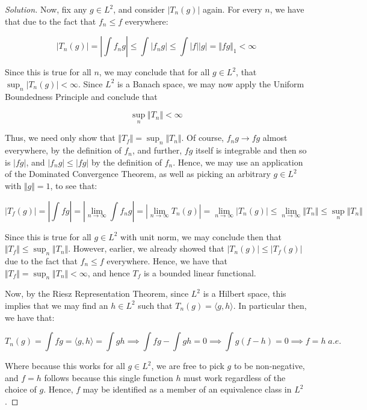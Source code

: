 \documentclass[10pt]{article}
\begin{document}
\begin{proof}[Solution]
Now, fix any $g \in L^2$, and consider $| T_n(g)|$ again. For every $n$, we have that due to the fact that $f_n \leq f$ everywhere:

$$ | T_n(g) | = \left| \int f_n g \right | \leq \int | f_n g |  \leq \int |f||g| = \Vert fg \Vert_1 < \infty $$

Since this is true for all $n$, we may conclude that for all $g \in L^2$, that $\sup_{n} | T_n(g) | < \infty$. Since $L^2$ is a Banach space, we may now apply the Uniform Boundedness Principle and conclude that

$$ \sup_{n} \Vert T_n \Vert < \infty$$

Thus, we need only show that $ \Vert T_f \Vert = \sup_{n} \Vert T_n \Vert$. Of course, $f_ng \to fg$ almost everywhere, by the definition of $f_n$, and further, $fg$ itself is integrable and then so is $|fg|$, and $| f_n g | \leq |fg|$ by the definition of $f_n$. Hence, we may use an application of the Dominated Convergence Theorem, as well as picking an arbitrary $g \in L^2$ with $\Vert g \Vert = 1$, to see that:



$$ | T_f(g) | = \left| \int fg \right| = \left|  \lim_{n \to \infty} \int f_n g \right| = \left| \lim_{n \to \infty} T_n(g) \right| = \lim_{n \to \infty} | T_n(g)| \leq \lim_{n \to \infty} \Vert T_n \Vert \leq \sup_{n} \Vert T_n \Vert$$

Since this is true for all $g \in L^2$ with unit norm, we may conclude then that $\Vert T_f \Vert \leq \sup_{n} \Vert T_n \Vert$. However, earlier, we already showed that $|T_n(g)| \leq |T_f(g)|$ due to the fact that $f_n \leq f$ everywhere. Hence, we have that $\Vert T_f \Vert = \sup_{n} \Vert T_n \Vert < \infty$, and hence $T_f$ is a bounded linear functional. 

Now, by the Riesz Representation Theorem, since $L^2$ is a Hilbert space, this implies that we may find an $h \in L^2$ such that $T_n(g) = \langle g, h \rangle$. In particular then, we have that:

$$ T_n(g) = \int fg = \langle g, h \rangle = \int gh \implies \int fg - \int gh = 0 \implies \int g(f-h) = 0 \implies f = h \; a.e.$$

Where because this works for all $g \in L^2$, we are free to pick $g$ to be non-negative, and $f = h$ follows because this single function $h$ must work regardless of the choice of $g$. Hence, $f$ may be identified as a member of an equivalence class in $L^2$.
\end{proof}
\end{document}
